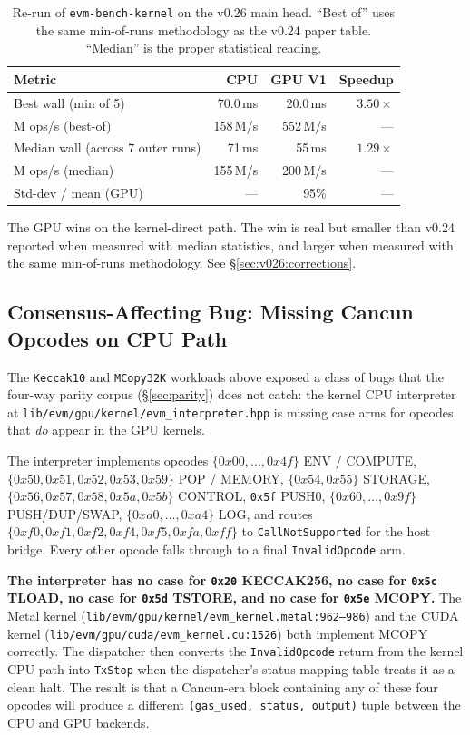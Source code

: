 \begin{table}[h]
\centering
\small
\begin{tabular}{lrrr}
\toprule
\textbf{Metric} & \textbf{CPU} & \textbf{GPU V1} & \textbf{Speedup} \\
\midrule
Best wall (min of 5)  & 70.0\,ms  & 20.0\,ms  & $3.50\times$ \\
M ops/s (best-of)     & 158\,M/s  & 552\,M/s  & --- \\
Median wall (across 7 outer runs) & 71\,ms & 55\,ms & $1.29\times$ \\
M ops/s (median)      & 155\,M/s  & 200\,M/s  & --- \\
Std-dev / mean (GPU)  & ---       & 95\%      & --- \\
\bottomrule
\end{tabular}
\caption{Re-run of \texttt{evm-bench-kernel} on the v0.26 main head.
``Best of'' uses the same min-of-runs methodology as the v0.24 paper
table. ``Median'' is the proper statistical reading.}
\label{tab:v026-kernel}
\end{table}

The GPU wins on the kernel-direct path. The win is real but smaller
than v0.24 reported when measured with median statistics, and larger
when measured with the same min-of-runs methodology. See
\S\ref{sec:v026:corrections}.

\subsection{Consensus-Affecting Bug: Missing Cancun Opcodes on CPU
Path}
\label{sec:v026:bug}

The \texttt{Keccak10} and \texttt{MCopy32K} workloads above exposed a
class of bugs that the four-way parity corpus
(\S\ref{sec:parity}) does not catch: the kernel CPU interpreter at
\texttt{lib/evm/gpu/kernel/evm\_interpreter.hpp} is missing case arms
for opcodes that \emph{do} appear in the GPU kernels.

The interpreter implements opcodes $\{0x00, \dots, 0x4f\}$ ENV /
COMPUTE, $\{0x50, 0x51, 0x52, 0x53, 0x59\}$ POP / MEMORY,
$\{0x54, 0x55\}$ STORAGE, $\{0x56, 0x57, 0x58, 0x5a, 0x5b\}$ CONTROL,
\texttt{0x5f} PUSH0, $\{0x60, \dots, 0x9f\}$ PUSH/DUP/SWAP,
$\{0xa0, \dots, 0xa4\}$ LOG, and routes
$\{0xf0, 0xf1, 0xf2, 0xf4, 0xf5, 0xfa, 0xff\}$ to
\texttt{CallNotSupported} for the host bridge. Every other opcode
falls through to a final \texttt{InvalidOpcode} arm.

\textbf{The interpreter has no case for \texttt{0x20} KECCAK256, no
case for \texttt{0x5c} TLOAD, no case for \texttt{0x5d} TSTORE, and
no case for \texttt{0x5e} MCOPY.} The Metal kernel
(\texttt{lib/evm/gpu/kernel/evm\_kernel.metal:962--986}) and the
CUDA kernel (\texttt{lib/evm/gpu/cuda/evm\_kernel.cu:1526}) both
implement MCOPY correctly. The dispatcher then converts the
\texttt{InvalidOpcode} return from the kernel CPU path into
\texttt{TxStop} when the dispatcher's status mapping table treats it
as a clean halt. The result is that a Cancun-era block containing any
of these four opcodes will produce a different
\texttt{(gas\_used, status, output)} tuple between the CPU and GPU
backends.

